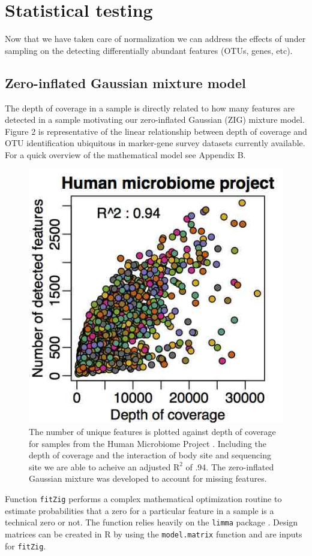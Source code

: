 \documentclass[a4paper,11pt]{article}\usepackage[]{graphicx}\usepackage[]{color}
\begin{document}
\newpage
\section{Statistical testing}
Now that we have taken care of normalization we can address the effects of under sampling on the detecting differentially abundant features (OTUs, genes, etc).

\subsection{Zero-inflated Gaussian mixture model}
The depth of coverage in a sample is directly related to how many features are detected in a sample motivating our zero-inflated Gaussian (ZIG) mixture model. Figure 2 is representative of the linear relationship between depth of coverage and OTU identification ubiquitous in marker-gene survey datasets currently available. For a quick overview of the mathematical model see Appendix B.

\begin{figure}
\centerline{\includegraphics[width=.55\textwidth]{metagenomeSeq_figure1.png}}
\caption{\footnotesize{The number of unique features is plotted against depth of coverage for samples from the Human Microbiome Project \cite{hmp}. Including the depth of coverage and the interaction of body site and sequencing site we are able to acheive an adjusted $\mathrm{R}^2$ of .94. The zero-inflated Gaussian mixture was developed to account for missing features.}}\label{fig1}
\end{figure}

Function \texttt{fitZig} performs a complex mathematical optimization routine to estimate probabilities that a zero for a particular feature in a sample is a technical zero or not. The function relies heavily on the \texttt{limma} package \cite{limma}. Design matrices can be created in R by using the \texttt{model.matrix} function and are inputs for \texttt{fitZig}. 
\end{document}
